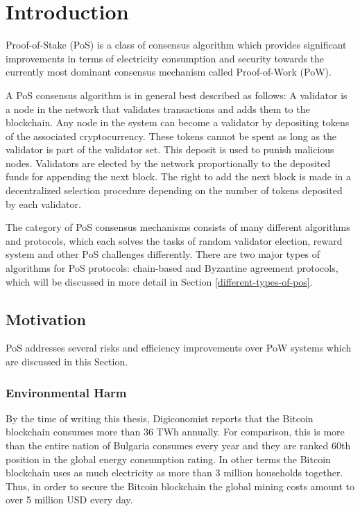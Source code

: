 \chapter{Introduction}
Proof-of-Stake (PoS) is a class of consensus algorithm which provides significant improvements in terms of electricity consumption and security towards the currently most dominant consensus mechanism called Proof-of-Work (PoW).

A PoS consensus algorithm is in general best described as follows: A validator is a node in the network that validates transactions and adds them to the blockchain. Any node in the system can become a validator by depositing tokens of the associated cryptocurrency. These tokens cannot be spent as long as the validator is part of the validator set. This deposit is used to punish malicious nodes. Validators are elected by the network proportionally to the deposited funds for appending the next block. The right to add the next block is made in a decentralized selection procedure depending on the number of tokens deposited by each validator.

The category of PoS consensus mechanisms consists of many different algorithms and protocols, which each solves the tasks of random validator election, reward system and other PoS challenges differently. There are two major types of algorithms for PoS protocols: chain-based and Byzantine agreement protocols, which will be discussed in more detail in Section \ref{different-types-of-pos}.

\section{Motivation}
PoS addresses several risks and efficiency improvements over PoW systems which are discussed in this Section. 

\subsection{Environmental Harm}
By the time of writing this thesis, Digiconomist \cite{digiconomist} reports that the Bitcoin blockchain consumes more than 36 TWh annually. For comparison, this is more than the entire nation of Bulgaria consumes every year and they are ranked 60th position in the global energy consumption rating. In other terms the Bitcoin blockchain uses as much electricity as more than 3 million households together. Thus, in order to secure the Bitcoin blockchain the global mining costs amount to over 5 million USD every day. 

